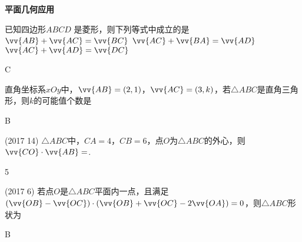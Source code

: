   \begin{exercise}{\textbf{平面几何应用}}
    \item
      已知四边形$ABCD$ 是菱形，则下列等式中成立的是\xz
        {$\vv{AB}+\vv{AC}=\vv{BC}$}
        {$\vv{AC}+\vv{BA}=\vv{AD}$}
        {$\vv{AC}+\vv{AD}=\vv{DC}$}
      \begin{answer}
        C
      \end{answer}
    \item%
      直角坐标系$xOy$中，$\vv{AB}=(2,1)$，$\vv{AC}=(3,k)$，若$\triangle{ABC}$是直角三角形，则$k$的可能值个数是\xz
      \begin{answer}
        B
      \end{answer}
    \item%
      (2017  14)
      $\triangle{ABC}$中，$CA=4$，$CB=6$，点$O$为$\triangle{ABC}$的外心，则$\vv{CO}\cdot\vv{AB}=$\tk.
      \begin{answer}
        5
      \end{answer}
    \item%
      (2017  6)
      若点$O$是$\triangle{ABC}$平面内一点，且满足$(\vv{OB}-\vv{OC})\cdot(\vv{OB}+\vv{OC}-2\vv{OA})=0$，则$\triangle{ABC}$形状为\xz
      \begin{answer}
        B
      \end{answer}
  \end{exercise}
\newpage

